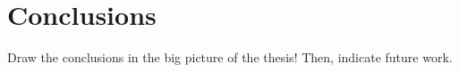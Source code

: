 \chapter{Conclusions}
\label{chapter:conclusions}

Draw the conclusions in the big picture of the thesis! Then, indicate future work.